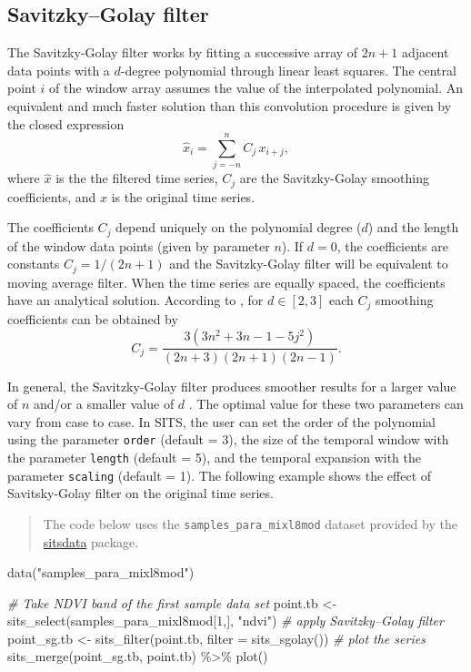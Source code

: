\documentclass[a4paper,]{tufte-book}
\newenvironment{Shaded}{}{}
\newcommand{\AttributeTok}[1]{\textcolor[rgb]{0.49,0.56,0.16}{#1}}
\newcommand{\CommentTok}[1]{\textcolor[rgb]{0.38,0.63,0.69}{\textit{#1}}}
\newcommand{\DecValTok}[1]{\textcolor[rgb]{0.25,0.63,0.44}{#1}}
\newcommand{\FunctionTok}[1]{\textcolor[rgb]{0.02,0.16,0.49}{#1}}
\newcommand{\NormalTok}[1]{#1}
\newcommand{\OtherTok}[1]{\textcolor[rgb]{0.00,0.44,0.13}{#1}}
\newcommand{\SpecialCharTok}[1]{\textcolor[rgb]{0.25,0.44,0.63}{#1}}
\newcommand{\StringTok}[1]{\textcolor[rgb]{0.25,0.44,0.63}{#1}}
\begin{document}
\hypertarget{savitzkygolay-filter}{%
\subsection{Savitzky--Golay filter}\label{savitzkygolay-filter}}

The Savitzky-Golay filter works by fitting a successive array of \(2n+1\) adjacent data points with a \(d\)-degree polynomial through linear least squares. The central point \(i\) of the window array assumes the value of the interpolated polynomial. An equivalent and much faster solution than this convolution procedure is given by the closed expression
\[
  {\hat{x}_{i}=\sum _{j=-n}^{n}C_{j}\,x_{i+j}},
\]
where \(\hat{x}\) is the the filtered time series, \(C_{j}\) are the Savitzky-Golay smoothing coefficients, and \(x\) is the original time series.

The coefficients \(C_{j}\) depend uniquely on the polynomial degree (\(d\)) and the length of the window data points (given by parameter \(n\)). If \({d=0}\), the coefficients are constants \({C_{j}=1/(2n+1)}\) and the Savitzky-Golay filter will be equivalent to moving average filter. When the time series are equally spaced, the coefficients have an analytical solution. According to \citet{Madden1978}, for \({d\in{}[2,3]}\) each \(C_{j}\) smoothing coefficients can be obtained by
\[
  C_{j}=\frac{3(3n^2+3n-1-5j^2)}{(2n+3)(2n+1)(2n-1)}.
\]

In general, the Savitzky-Golay filter produces smoother results for a larger value of \(n\) and/or a smaller value of \(d\) \citep{Chen2004}. The optimal value for these two parameters can vary from case to case. In SITS, the user can set the order of the polynomial using the parameter \texttt{order} (default = 3), the size of the temporal window with the parameter \texttt{length} (default = 5), and the temporal expansion with the parameter \texttt{scaling} (default = 1). The following example shows the effect of Savitsky-Golay filter on the original time series.

\begin{quote}
The code below uses the \texttt{samples\_para\_mixl8mod} dataset provided by the \href{https://github.com/e-sensing/sitsdata}{sitsdata} package.
\end{quote}

\begin{Shaded}
\begin{Highlighting}[]
\FunctionTok{data}\NormalTok{(}\StringTok{"samples\_para\_mixl8mod"}\NormalTok{)}

\CommentTok{\# Take NDVI band of the first sample data set}
\NormalTok{point.tb }\OtherTok{\textless{}{-}} \FunctionTok{sits\_select}\NormalTok{(samples\_para\_mixl8mod[}\DecValTok{1}\NormalTok{,], }\StringTok{"ndvi"}\NormalTok{)}
\CommentTok{\# apply Savitzky–Golay filter}
\NormalTok{point\_sg.tb }\OtherTok{\textless{}{-}} \FunctionTok{sits\_filter}\NormalTok{(point.tb, }\AttributeTok{filter =} \FunctionTok{sits\_sgolay}\NormalTok{())}
\CommentTok{\# plot the series}
\FunctionTok{sits\_merge}\NormalTok{(point\_sg.tb, point.tb) }\SpecialCharTok{\%\textgreater{}\%} \FunctionTok{plot}\NormalTok{()}
\end{Highlighting}
\end{Shaded}
\end{document}

